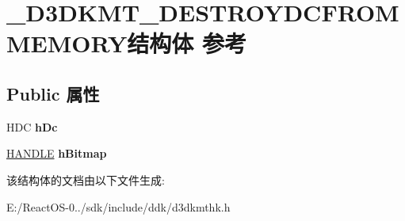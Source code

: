 \hypertarget{struct___d3_d_k_m_t___d_e_s_t_r_o_y_d_c_f_r_o_m_m_e_m_o_r_y}{}\section{\+\_\+\+D3\+D\+K\+M\+T\+\_\+\+D\+E\+S\+T\+R\+O\+Y\+D\+C\+F\+R\+O\+M\+M\+E\+M\+O\+R\+Y结构体 参考}
\label{struct___d3_d_k_m_t___d_e_s_t_r_o_y_d_c_f_r_o_m_m_e_m_o_r_y}
\subsection*{Public 属性}
\begin{DoxyCompactItemize}
\item 
\mbox{\label{struct___d3_d_k_m_t___d_e_s_t_r_o_y_d_c_f_r_o_m_m_e_m_o_r_y_a6d61c081002c3aa357e2af3558178a80}} 
H\+DC {\bfseries h\+Dc}
\item 
\mbox{\label{struct___d3_d_k_m_t___d_e_s_t_r_o_y_d_c_f_r_o_m_m_e_m_o_r_y_a871be56000d6effc3c8cc29cc389ca56}} 
\hyperlink{interfacevoid}{H\+A\+N\+D\+LE} {\bfseries h\+Bitmap}
\end{DoxyCompactItemize}


该结构体的文档由以下文件生成\+:\begin{DoxyCompactItemize}
\item 
E\+:/\+React\+O\+S-\/0../sdk/include/ddk/d3dkmthk.\+h\end{DoxyCompactItemize}
